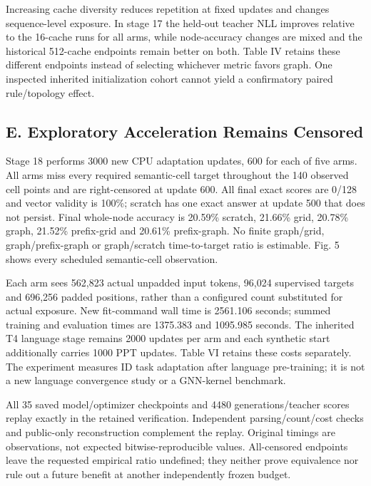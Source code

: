 \documentclass[10pt,letterpaper,twocolumn]{article}
\begin{document}
Increasing cache diversity reduces repetition at fixed updates and changes sequence-level exposure. In stage 17 the held-out teacher NLL improves relative to the 16-cache runs for all arms, while node-accuracy changes are mixed and the historical 512-cache endpoints remain better on both. Table IV retains these different endpoints instead of selecting whichever metric favors graph. One inspected inherited initialization cohort cannot yield a confirmatory paired rule/\allowbreak{}topology effect.

\subsection*{E. Exploratory Acceleration Remains Censored}
Stage 18 performs 3000 new CPU adaptation updates, 600 for each of five arms. All arms miss every required semantic-cell target throughout the 140 observed cell points and are right-censored at update 600. All final exact scores are 0/\allowbreak{}128 and vector validity is 100\%; scratch has one exact answer at update 500 that does not persist. Final whole-node accuracy is 20.59\% scratch, 21.66\% grid, 20.78\% graph, 21.52\% prefix-grid and 20.61\% prefix-graph. No finite graph/\allowbreak{}grid, graph/\allowbreak{}prefix-graph or graph/\allowbreak{}scratch time-to-target ratio is estimable. Fig. 5 shows every scheduled semantic-cell observation.

Each arm sees 562,823 actual unpadded input tokens, 96,024 supervised targets and 696,256 padded positions, rather than a configured count substituted for actual exposure. New fit-command wall time is 2561.106 seconds; summed training and evaluation times are 1375.383 and 1095.985 seconds. The inherited T4 language stage remains 2000 updates per arm and each synthetic start additionally carries 1000 PPT updates. Table VI retains these costs separately. The experiment measures ID task adaptation after language pre-training; it is not a new language convergence study or a GNN-kernel benchmark.

All 35 saved model/\allowbreak{}optimizer checkpoints and 4480 generations/\allowbreak{}teacher scores replay exactly in the retained verification. Independent parsing/\allowbreak{}count/\allowbreak{}cost checks and public-only reconstruction complement the replay. Original timings are observations, not expected bitwise-reproducible values. All-censored endpoints leave the requested empirical ratio undefined; they neither prove equivalence nor rule out a future benefit at another independently frozen budget.
\end{document}
